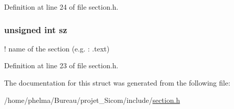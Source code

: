 Definition at line 24 of file section.\-h.

\hypertarget{structsection_a2c1bd10d4bbc82d2d6c052c5842c0c8c}{
\subsubsection[{sz}]{\setlength{\rightskip}{0pt plus 5cm}unsigned int sz}}\label{structsection_a2c1bd10d4bbc82d2d6c052c5842c0c8c}
! name of the section (e.\-g. \-: .text) 

Definition at line 23 of file section.\-h.



The documentation for this struct was generated from the following file\-:\begin{DoxyCompactItemize}
\item 
/home/phelma/\-Bureau/projet\-\_\-\-Sicom/include/\hyperlink{section_8h}{section.\-h}\end{DoxyCompactItemize}
